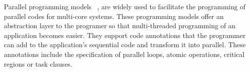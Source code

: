 \label{chapter.background.TB}
Parallel programming models ~\cite{Blumofe:PPoPP1995, Reinders2007, Bauer2012, OmpSs},  are widely used to facilitate the programming of parallel codes for multi-core systems.
These programming models offer an abstraction layer to the programer so that multi-threaded programming of an application becomes easier.
They support code annotations that the programmer can add to the application's sequential code and transform it into parallel.
These annotations include the specification of parallel loops, atomic operations, critical regions or task clauses.

